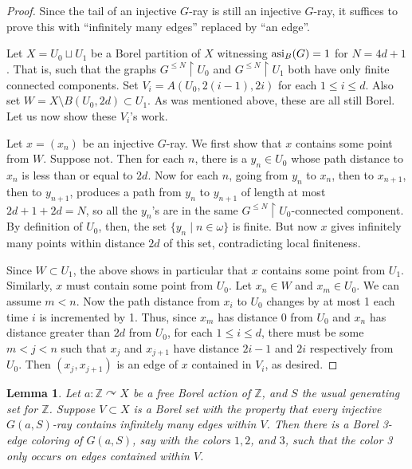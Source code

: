 \documentclass[10pt,a4paper]{article}
\newcommand{\0}{\varnothing}
\newcommand{\Z}{\mathbb{Z}}
\newcommand{\asi}{\textnormal{asi}}
\newcommand{\res}{\upharpoonright}
\newtheorem{lemma}{Lemma}
\begin{document}
\begin{proof}
Since the tail of an injective $G$-ray is still an injective $G$-ray, it suffices to prove this with ``infinitely many edges'' replaced by ``an edge''. 

Let $X = U_0 \sqcup U_1$ be a Borel partition of $X$ witnessing $\asi_B(G) = 1$ for $N = 4d+1$. That is, such that the graphs $G^{\leq N} \res U_0$ and $G^{\leq N} \res U_1$ both have only finite connected components. Set $V_i = A(U_0,2(i-1),2i)$ for each $1 \leq i \leq d$. Also set $W = X \setminus B(U_0,2d) \subset U_1$. As was mentioned above, these are all still Borel. Let us now show these $V_i$'s work.

Let $x = (x_n)$ be an injective $G$-ray. We first show that $x$ contains some point from $W$. Suppose not. Then for each $n$, there is a $y_n \in U_0$ whose path distance to $x_n$ is less than or equal to $2d$. Now for each $n$, going from $y_n$ to $x_n$, then to $x_{n+1}$, then to $y_{n+1}$, produces a path from $y_n$ to $y_{n+1}$ of length at most $2d+1+2d=N$, so all the $y_n$'s are in the same $G^{\leq N} \res U_0$-connected component. By definition of $U_0$, then, the set $\{y_n \mid n \in \omega\}$ is finite. But now $x$ gives infinitely many points within distance $2d$ of this set, contradicting local finiteness.

Since $W \subset U_1$, the above shows in particular that $x$ contains some point from $U_1$. Similarly, $x$ must contain some point from $U_0$. Let $x_n \in W$ and $x_m \in U_0$. We can assume $m < n$. Now the path distance from $x_i$ to $U_0$ changes by at most 1 each time $i$ is incremented by 1. Thus, since $x_m$ has distance 0 from $U_0$ and $x_n$ has distance greater than $2d$ from $U_0$, for each $1 \leq i \leq d$, there must be some $m < j < n$ such that $x_{j}$ and $x_{j+1}$ have distance $2i-1$ and $2i$ respectively from $U_0$. Then $(x_j,x_{j+1})$ is an edge of $x$ contained in $V_i$, as desired.

\end{proof}

\begin{lemma}\label{lem:Z}
Let $a:\Z \curvearrowright X$ be a free Borel action of $\Z$, and $S$ the usual generating set for $\Z$. Suppose $V \subset X$ is a Borel set with the property that every injective $G(a,S)$-ray contains infinitely many edges within $V$. Then there is a Borel 3-edge coloring of $G(a,S)$, say with the colors $1,2$, and $3$, such that the color 3 only occurs on edges contained within $V$.
\end{lemma}
\end{document}
